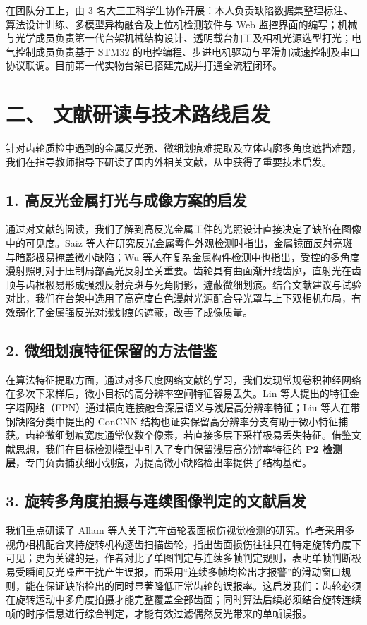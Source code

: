在团队分工上，由 3 名大三工科学生协作开展：本人负责缺陷数据集整理标注、算法设计训练、多模型异构融合及上位机检测软件与 Web 监控界面的编写；机械与光学成员负责第一代台架机械结构设计、透明载台加工及相机光源选型打光；电气控制成员负责基于 STM32 的电控编程、步进电机驱动与平滑加减速控制及串口协议联调。目前第一代实物台架已搭建完成并打通全流程闭环。

\section*{二、 文献研读与技术路线启发}

针对齿轮质检中遇到的金属反光强、微细划痕难提取及立体齿廓多角度遮挡难题，我们在指导教师指导下研读了国内外相关文献，从中获得了重要技术启发。

\subsection*{1. 高反光金属打光与成像方案的启发}
通过对文献的阅读，我们了解到高反光金属工件的光照设计直接决定了缺陷在图像中的可见度。Saiz 等人在研究反光金属零件外观检测时指出，金属镜面反射亮斑与暗影极易掩盖微小缺陷；Wu 等人在复杂金属构件检测中也指出，受控的多角度漫射照明对于压制局部高光反射至关重要。齿轮具有曲面渐开线齿廓，直射光在齿顶与齿根极易形成强烈反射亮斑与死角阴影，遮蔽微细划痕。结合文献建议与试验对比，我们在台架中选用了高亮度白色漫射光源配合导光罩与上下双相机布局，有效弱化了金属强反光对浅划痕的遮蔽，改善了成像质量。

\subsection*{2. 微细划痕特征保留的方法借鉴}
在算法特征提取方面，通过对多尺度网络文献的学习，我们发现常规卷积神经网络在多次下采样后，微小目标的高分辨率空间特征容易丢失。Lin 等人提出的特征金字塔网络（FPN）通过横向连接融合深层语义与浅层高分辨率特征；Liu 等人在带钢缺陷分类中提出的 ConCNN 结构也证实保留高分辨率分支有助于微小特征捕获。齿轮微细划痕宽度通常仅数个像素，若直接多层下采样极易丢失特征。借鉴文献思想，我们在目标检测模型中引入了专门保留浅层高分辨率特征的 \textbf{P2 检测层}，专门负责捕获细小划痕，为提高微小缺陷检出率提供了结构基础。

\subsection*{3. 旋转多角度拍摄与连续图像判定的文献启发}
我们重点研读了 Allam 等人关于汽车齿轮表面损伤视觉检测的研究。作者采用多视角相机配合夹持旋转机构逐齿扫描齿轮，指出齿面损伤往往只在特定旋转角度下可见；更为关键的是，作者对比了单图判定与连续多帧判定规则，表明单帧判断极易受瞬间反光噪声干扰产生误报，而采用“连续多帧均检出才报警”的滑动窗口规则，能在保证缺陷检出的同时显著降低正常齿轮的误报率。这启发我们：齿轮必须在旋转运动中多角度拍摄才能完整覆盖全部齿面；同时算法后续必须结合旋转连续帧的时序信息进行综合判定，才能有效过滤偶然反光带来的单帧误报。

